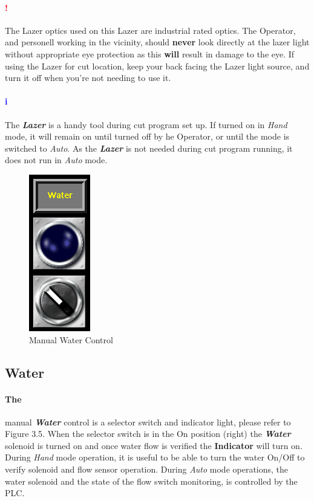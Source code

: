 \paragraph{\textbf{{\LARGE \textcolor{red}{!}}}} The Lazer optics used on this Lazer are industrial rated optics. The Operator, and personell working in the vicinity, should \textbf{never} look directly at the lazer light without appropriate eye protection as this \textbf{will} result in damage to the eye. If using the Lazer for cut location, keep your back facing the Lazer light source, and turn it off when you're not needing to use it.
\paragraph{\textbf{\LARGE \textcolor{blue}{i}}} The \textbf{\textit{Lazer}} is a handy tool during cut program set up. If turned on in \textit{Hand} mode, it will remain on until turned off by he Operator, or until the mode is switched to \textit{Auto}. As the \textbf{\textit{Lazer}} is not needed during cut program running, it does not run in \textit{Auto} mode.
\pagebreak
\begin{figure}
	\centering
	\includegraphics[width=.2\linewidth]{screen-captures/manual/manual-water}
	\caption{Manual Water Control}
	\label{fig:manual-water}
\end{figure}
\subsection{Water}\paragraph*{The}manual \textbf{\textit{Water}} control is a selector switch and indicator light, please refer to Figure 3.5. When the selector switch is in the On position (right) the \textbf{\textit{Water}} solenoid is turned on and once water flow is verified the \textbf{Indicator} will turn on. During \textit{Hand} mode operation, it is useful to be able to turn the water On/Off to verify solenoid and flow sensor operation. During \textit{Auto} mode operations, the water solenoid and the state of the flow switch monitoring, is controlled by the PLC.
